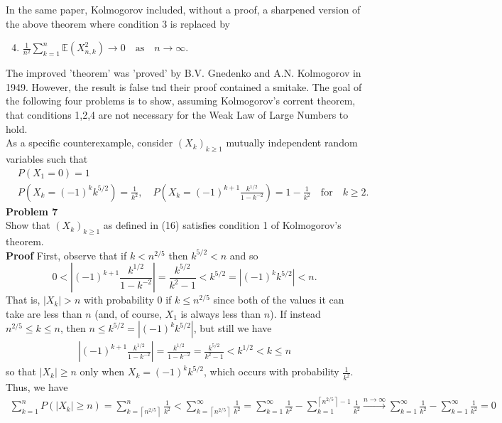\documentclass[10pt]{article}
\newcommand{\E}{\mathbb{E}}
\newcommand{\bp}[1]{\left({#1}\right)}
\newcommand{\1}[1]{\mathbbm{1}_{#1}}
\newcommand*{\ceil}[1]{\left\lceil#1\right\rceil}
\begin{document}
    \noindent In the same paper, Kolmogorov included, without a proof, a sharpened version of the above theorem where condition $3$ is replaced by
    \begin{enumerate}
        \setcounter{enumi}{3}
        \item $\frac{1}{n^2}\sum_{k=1}^n\E(X_{n,k}^2)\rightarrow 0\quad\text{as}\quad n\rightarrow\infty$.
    \end{enumerate}
    The improved 'theorem' was 'proved' by B.V. Gnedenko and A.N. Kolmogorov in 1949. However, the result is false tnd their proof contained a smitake. The goal of the following four problems is to show, assuming Kolmogorov's corrent theorem, that conditions 1,2,4 
    are not necessary for the Weak Law of Large Numbers to hold.\\[5pt]
    As a specific counterexample, consider $(X_k)_{k\geq 1}$ mutually independent random variables such that
    \begin{align*}
        &P(X_1=0)=1\\
        &P\bp{X_k=(-1)^kk^{5/2}}=\frac{1}{k^2},\quad P\bp{X_k=(-1)^{k+1}\frac{k^{1/2}}{1-k^{-2}}}=1-\frac{1}{k^2}\quad\text{for}\quad k\geq 2.\tag{16}
    \end{align*} 
    {\bf Problem 7}\\[5pt]
    Show that $(X_k)_{k\geq 1}$ as defined in (16) satisfies condition 1 of Kolmogorov's theorem.\\[5pt]
    {\bf Proof}\hspace{5pt} First, observe that if $k<n^{2/5}$ then $k^{5/2}<n$ and so
    \[0<\left|(-1)^{k+1}\frac{k^{1/2}}{1-k^{-2}}\right|=\frac{k^{5/2}}{k^2-1}<k^{5/2}=\left|(-1)^kk^{5/2}\right|<n.\tag{17}\]
    That is, $|X_k|>n$ with probability $0$ if $k\leq n^{2/5}$ since both of the values it can take are less than $n$ (and, of course, $X_1$ is always less than $n$). If instead $n^{2/5}\leq k\leq n$, then $n\leq k^{5/2}=|(-1)^kk^{5/2}|$, but still we have
    \begin{align*}
        \left|(-1)^{k+1}\frac{k^{1/2}}{1-k^{-2}}\right|=\frac{k^{1/2}}{1-k^{-2}}=\frac{k^{5/2}}{k^2-1}< k^{1/2}<k\leq n\tag{18}
    \end{align*}
    so that $|X_k|\geq n$ only when $X_k=(-1)^kk^{5/2}$, which occurs with probability $\tfrac{1}{k^2}$. Thus, we have
    \begin{align*}
        \sum_{k=1}^nP(|X_k|\geq n)=\sum_{k=\ceil{n^{2/5}}}^n\frac{1}{k^2}<\sum_{k=\ceil{n^{2/5}}}^\infty\frac{1}{k^2}=\sum_{k=1}^\infty\frac{1}{k^2}-\sum_{k=1}^{\ceil{n^{2/5}}-1}\frac{1}{k^2}\overset{n\rightarrow\infty}{\longrightarrow}\sum_{k=1}^\infty\frac{1}{k^2}-\sum_{k=1}^\infty\frac{1}{k^2}=0
    \end{align*}
\end{document}

